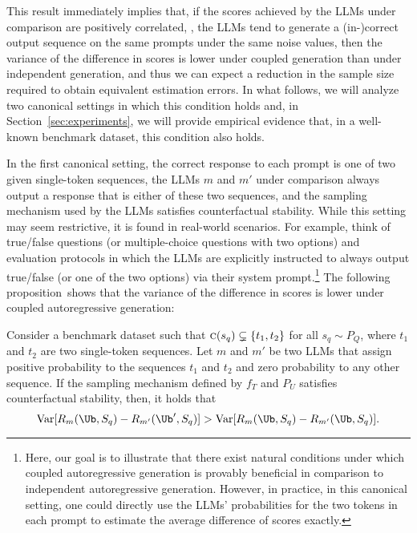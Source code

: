 %
This result immediately implies that, if the scores achieved by the LLMs under comparison are positively correlated, \ie, the LLMs tend to generate a (in-)correct output sequence on the same prompts under the same noise values, then the variance of the difference in scores is lower under coupled generation than under independent generation, and thus we can expect a reduction in the sample size required to obtain equivalent estimation errors.
%
In what follows, we will analyze two canonical settings in which this condition holds and, in Section~\ref{sec:experiments}, we will provide empirical evidence that, in a well-known benchmark dataset, this condition also holds.

In the first canonical setting, the correct response to each prompt is one of two given single-token sequences, the LLMs $m$ and $m'$ under comparison always output a response that is either of these two sequences, and the sampling mechanism used by the LLMs satisfies counterfactual stability.
%
While this setting may seem restrictive, it is found in real-world scenarios. 
%
For example, think of true/false questions (or multiple-choice questions with two options) and evaluation protocols in which the LLMs are explicitly instructed to always output true/false (or one of the two options) via their system  prompt.\footnote{Here, our goal is to illustrate that there exist natural conditions under which coupled autoregressive generation is provably beneficial in comparison to independent autoregressive generation. However, in practice, in this canonical setting, one could directly use the LLMs' probabilities for the two tokens in each prompt to estimate the average difference of scores exactly.} 
%
The following proposition~shows that the variance of the difference in scores is lower under coupled autoregressive generation:
\begin{proposition} \label{prop:var_stability}
    Consider a benchmark dataset such that $\textsc{c}(s_q) \subsetneq \{t_1, t_2\}$ for all $s_q \sim P_Q$, where $t_1$ and $t_2$ are two single-token sequences. Let $m$ and $m'$ be two LLMs that assign positive probability to the sequences $t_1$ and $t_2$ and zero probability to any other sequence.
    If the sampling mechanism defined by $f_T$ and $P_U$ satisfies counterfactual stability, then, it holds that
    \begin{equation}\label{eq:binary_var}
        \textnormal{Var}[R_m(\Ub,S_q)-R_{m'}(\Ub',S_q)] > \textnormal{Var}[R_m(\Ub,S_q)-R_{m'}(\Ub,S_q)]. 
    \end{equation}
\end{proposition}

